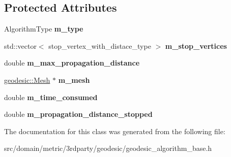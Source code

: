 \subsection*{Protected Attributes}
\begin{DoxyCompactItemize}
\item 
\hypertarget{classgeodesic_1_1_geodesic_algorithm_base_acfae8cd7708554fc43c3a4de82706a68}{}Algorithm\+Type {\bfseries m\+\_\+type}\label{classgeodesic_1_1_geodesic_algorithm_base_acfae8cd7708554fc43c3a4de82706a68}

\item 
\hypertarget{classgeodesic_1_1_geodesic_algorithm_base_ad88f249e874b8445f3d92846bf39875f}{}std\+::vector$<$ stop\+\_\+vertex\+\_\+with\+\_\+distace\+\_\+type $>$ {\bfseries m\+\_\+stop\+\_\+vertices}\label{classgeodesic_1_1_geodesic_algorithm_base_ad88f249e874b8445f3d92846bf39875f}

\item 
\hypertarget{classgeodesic_1_1_geodesic_algorithm_base_ac4f8f7cc46da5fc1b013a3a9b83d0843}{}double {\bfseries m\+\_\+max\+\_\+propagation\+\_\+distance}\label{classgeodesic_1_1_geodesic_algorithm_base_ac4f8f7cc46da5fc1b013a3a9b83d0843}

\item 
\hypertarget{classgeodesic_1_1_geodesic_algorithm_base_a60c4d6e286af80a84875bf2a15ebf7dc}{}\hyperlink{classgeodesic_1_1_mesh}{geodesic\+::\+Mesh} $\ast$ {\bfseries m\+\_\+mesh}\label{classgeodesic_1_1_geodesic_algorithm_base_a60c4d6e286af80a84875bf2a15ebf7dc}

\item 
\hypertarget{classgeodesic_1_1_geodesic_algorithm_base_a5eab429056495d7709bb02d300d03e7a}{}double {\bfseries m\+\_\+time\+\_\+consumed}\label{classgeodesic_1_1_geodesic_algorithm_base_a5eab429056495d7709bb02d300d03e7a}

\item 
\hypertarget{classgeodesic_1_1_geodesic_algorithm_base_ac45e2667cee21ed383301029bfbcef9d}{}double {\bfseries m\+\_\+propagation\+\_\+distance\+\_\+stopped}\label{classgeodesic_1_1_geodesic_algorithm_base_ac45e2667cee21ed383301029bfbcef9d}

\end{DoxyCompactItemize}


The documentation for this class was generated from the following file\+:\begin{DoxyCompactItemize}
\item 
src/domain/metric/3rdparty/geodesic/geodesic\+\_\+algorithm\+\_\+base.\+h\end{DoxyCompactItemize}

